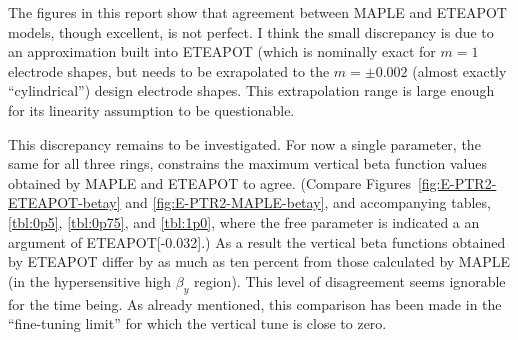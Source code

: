 \documentclass[]{article}
\begin{document}
The figures in this report show that agreement between MAPLE and ETEAPOT models, though excellent,
is not perfect. I think the small discrepancy is due to an approximation built into ETEAPOT (which
is nominally exact for $m=1$ electrode shapes, but needs to be exrapolated to the $m=\pm0.002$
(almost exactly ``cylindrical'') design electrode shapes. This extrapolation range is large
enough for its linearity assumption to be questionable. 

This discrepancy remains to be investigated. For now
a single parameter, the same for all three rings, constrains the maximum 
vertical beta function values obtained by MAPLE and ETEAPOT to agree. 
(Compare Figures~\ref{fig:E-PTR2-ETEAPOT-betay} and \ref{fig:E-PTR2-MAPLE-betay},
and accompanying tables, \ref{tbl:0p5}, \ref{tbl:0p75}, and \ref{tbl:1p0},
where the free parameter is indicated a an argument of ETEAPOT[-0.032].)
As a result the vertical beta functions obtained by ETEAPOT differ by as much as
ten percent from those calculated by MAPLE (in the hypersensitive high $\beta_y$ region).
This level of disagreement seems ignorable for the time being. As already mentioned, 
this comparison has been made in the ``fine-tuning limit'' for which the vertical tune
is close to zero.
\end{document}

